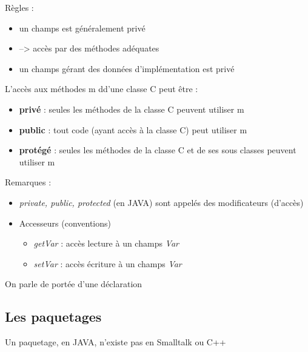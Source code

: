 \documentclass{article}
\begin{document}
Règles :
\begin{itemize}
	\item un champs est généralement privé
	\item --> accès par des méthodes adéquates
	\item un champs gérant des données d'implémentation est privé
\end{itemize}

L'accès aux méthodes m dd'une classe C peut être :
\begin{itemize}
	\item \textbf{privé} : seules les méthodes de la classe C peuvent utiliser m
	\item \textbf{public} : tout code (ayant accès à la classe C) peut utiliser m
	\item \textbf{protégé} : seules les méthodes de la classe C et de ses sous classes
peuvent utiliser m 
\end{itemize}

Remarques :
\begin{itemize}
	\item \emph{private, public, protected} (en JAVA) sont appelés des
modificateurs (d'accès)
	\item Accesseurs (conventions)
	\begin{itemize}
		\item \emph{getVar} : accès lecture à un champs \emph{Var}
		\item \emph{setVar} : accès écriture à un champs \emph{Var}
	\end{itemize}
\end{itemize}

On parle de portée d'une déclaration

\subsection{Les paquetages}

Un paquetage, en JAVA, n'existe pas en Smalltalk ou C++
\end{document}
